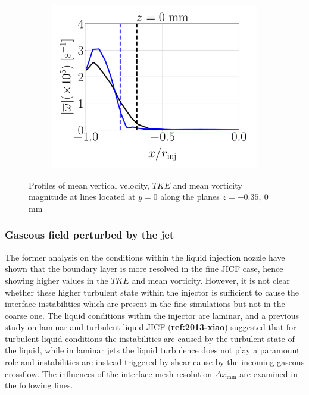 \begin{figure}[ht]
\begin{subfigure}[b]{0.3\textwidth}
	\flushleft
   \includegraphics[scale=0.225]{./part2_developments/figures_ch5_resolved_JICF/instabilities_resolution/line_data_injector_vort_z0p00}
\end{subfigure}

   \caption{Profiles of mean vertical velocity, $TKE$ and mean vorticity magnitude at lines located at $y = 0$ along the planes $z = -0.35,~0$ mm}
\label{fig:jicf_data_lines_inside_injector}
\end{figure}


\subsubsection*{Gaseous field perturbed by the jet}


The former analysis on the conditions within the liquid injection nozzle have shown that the boundary layer is more resolved in the fine JICF case, hence showing higher values in the $TKE$ and mean vorticity. However, it is not clear whether these higher turbulent state within the injector is sufficient to cause the interface instabilities which are present in the fine simulations but not in the coarse one. The liquid conditions within the injector are laminar, and a previous study on laminar and turbulent liquid JICF (\textbf{ref:2013-xiao}) suggested that for turbulent liquid conditions the instabilities are caused by the turbulent state of the liquid, while in laminar jets the liquid turbulence does not play a paramount role and instabilities are instead triggered by shear cause by the incoming gaseous crossflow. The influences of the interface mesh resolution $\Delta x_\mathrm{min}$ are examined in the following lines.



